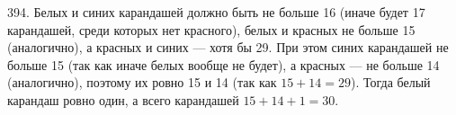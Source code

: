 394. Белых и синих карандашей должно быть не больше 16 (иначе будет 17 карандашей, среди которых нет красного), белых и красных не больше 15 (аналогично), а красных и синих --- хотя бы 29. При этом синих карандашей не больше 15 (так как иначе белых вообще не будет), а красных --- не больше 14 (аналогично), поэтому их ровно 15 и 14 (так как $15+14=29$). Тогда белый карандаш ровно один, а всего карандашей $15+14+1=30.$\\
